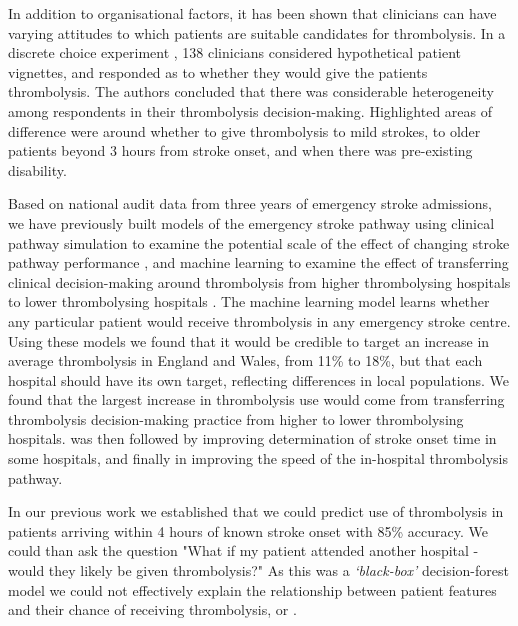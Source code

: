 In addition to organisational factors, it has been shown that clinicians can have varying attitudes to which patients are suitable candidates for thrombolysis. In a discrete choice experiment \cite{de_brun_factors_2018}, 138 clinicians considered hypothetical patient vignettes, and responded as to whether they would give the patients thrombolysis. The authors concluded that there was considerable heterogeneity among respondents in their thrombolysis decision-making. Highlighted areas of difference were around whether to give thrombolysis to mild strokes, to older patients beyond 3 hours from stroke onset, and when there was pre-existing disability.

Based on national audit data from three years of emergency stroke admissions, we have previously built models of the emergency stroke pathway using clinical pathway simulation to examine the potential scale of the effect of changing  stroke pathway performance , and  machine learning to examine the effect of transferring clinical decision-making around thrombolysis from higher thrombolysing hospitals to lower thrombolysing hospitals \cite{allen_using_2022, allen_use_2022}. The machine learning model learns whether any particular patient would receive thrombolysis in any emergency stroke centre. Using these models we found that it would be credible to target an increase in average thrombolysis in England and Wales, from 11\% to 18\%, but that each hospital should have its own target, reflecting differences in local populations. We found that the largest increase in thrombolysis use would come from transferring thrombolysis decision-making practice from higher to lower thrombolysing hospitals.  was then followed by improving determination of stroke onset time in some hospitals, and finally in improving the speed of the in-hospital thrombolysis pathway.


In our previous work we established that we could predict  use of thrombolysis in patients arriving within 4 hours of known stroke onset with 85\% accuracy. We could than ask the question "What if my patient attended another hospital - would they likely be given thrombolysis?" As this was a \emph{`black-box'} decision-forest model we could not effectively explain the relationship between patient features and their chance of receiving thrombolysis, or .

